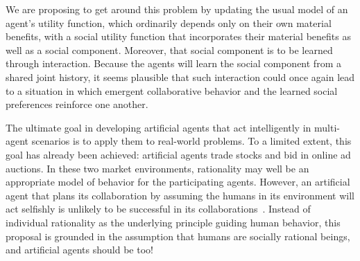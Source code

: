 We are proposing to get around this problem by updating the usual
model of an agent's utility function, which ordinarily depends only on
their own material benefits, with a social utility function that
incorporates their material benefits as well as a social component.
Moreover, that social component is to be learned through interaction.
Because the agents will learn the social component from a shared joint
history, it seems plausible that such interaction could once again
lead to a situation in which emergent collaborative behavior and the
learned social preferences reinforce one another.

The ultimate goal in developing artificial agents that act
intelligently in multi-agent scenarios is to apply them to real-world
problems.  To a limited extent, this goal has already been achieved:
artificial agents trade stocks and bid in online ad auctions.  In
these two market environments, rationality may well be an appropriate
model of behavior for the participating agents.  However,
an artificial agent that plans its collaboration by assuming the
humans in its environment will act selfishly is unlikely to be
successful in its collaborations~\cite{Camerer:2003,kahnemanst82}.
Instead of individual rationality as the underlying principle guiding
human behavior, this proposal is grounded in the assumption that
humans are socially rational beings, and artificial agents should be
too!  


